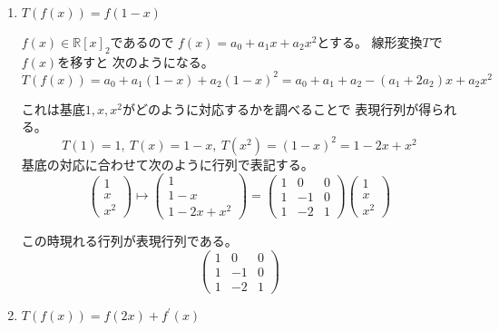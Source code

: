 \documentclass[12pt,b5paper]{ltjsarticle}
\begin{document}
\begin{enumerate}
 \item
      $T(f(x))=f(1-x)$

      \dotfill

      $f(x)\in\mathbb{R}[x]_{2}$であるので
      $f(x)=a_0+a_1x+a_2x^2$とする。
      線形変換$T$で$f(x)$を移すと
      次のようになる。
      \begin{equation}
       T(f(x))
        =a_0+a_1(1-x)+a_2(1-x)^2
        =a_0+a_1+a_2 - (a_1 +2a_2)x + a_2x^2
      \end{equation}

      これは基底$1,x,x^2$がどのように対応するかを調べることで
      表現行列が得られる。
      \begin{equation}
       T(1)=1,\ T(x)=1-x,\ T(x^2)=(1-x)^2=1-2x+x^2
      \end{equation}
      基底の対応に合わせて次のように行列で表記する。
      \begin{equation}
       \begin{pmatrix}
        1\\x\\x^2
       \end{pmatrix}
       \mapsto
       \begin{pmatrix}
        1\\1-x\\1-2x+x^2
       \end{pmatrix}
       =
       \begin{pmatrix}
        1 & 0 & 0 \\
        1 & -1 & 0 \\
        1 & -2 & 1
       \end{pmatrix}
       \begin{pmatrix}
        1\\x\\x^2
       \end{pmatrix}
      \end{equation}


      この時現れる行列が表現行列である。
      \begin{equation}
       \begin{pmatrix}
        1 & 0 & 0 \\
        1 & -1 & 0 \\
        1 & -2 & 1
       \end{pmatrix}
      \end{equation}


      \hrulefill

 \item
      $T(f(x))=f(2x)+f^{\prime}(x)$


\end{enumerate}
\end{document}

